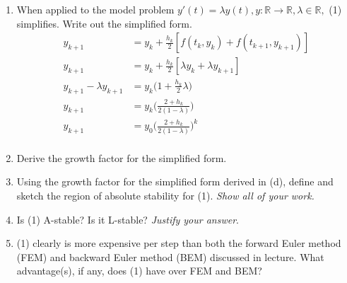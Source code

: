\documentclass{article}
\begin{document}
\begin{enumerate}
\begin{enumerate}
\begin{align*}
                    &\text{Using MVT to simplify} \\
                    y(t_{k+1}) - y_{k+1} &= 
                    y(t_k) - y_k + \frac{h}{2}
                    [f_y (t_k, \eta_k)(y(t_k) - y_k) 
                    + f_y (t_{k+1}, \eta_{k+1})(y(t_{k+1}) - y_{k+1})]
                    + \frac{h^3}{3!}y'''(\psi) \\
                    [I + f_y (t_{k+1}, \eta_{k+1})](y(t_{k+1}) - y_{k+1})] 
                    &= \frac{h}{2}
                    [I + f_y (t_k, \eta_k)](y(t_k) - y_k)
                    + \frac{h^3}{3!}y'''(\psi) \\
                \end{align*}
            \item When applied to the model problem $y'(t) = \lambda y(t),
                y: \mathbb{R} \rightarrow \mathbb{R}, \lambda \in 
                \mathbb{R},$ (1) simplifies. Write out the simplified form.
                \begin{align*}
                y_{k+1} &= y_k + \frac{h_k}{2}[f(t_k,y_k) 
                + f(t_{k+1}, y_{k+1})] \\
                y_{k+1} &= y_k + \frac{h_k}{2}[\lambda y_k
                + \lambda y_{k+1}] \\
                y_{k+1} - \lambda y_{k+1} &= 
                y_k \bigg( 1 +  \frac{h_k}{2}\lambda \bigg) \\
                y_{k+1} &= y_k \bigg( \frac{2 + h_k}{2(1-\lambda)}\bigg) \\
                y_{k+1} &= y_0 \bigg( \frac{2 + h_k}{2(1-\lambda)}
                \bigg)^k \\
                \end{align*}
            \item Derive the growth factor for the simplified form.
            \item Using the growth factor for the simplified form derived
                in (d), define and sketch the region of absolute stability
                for (1). \textit{Show all of your work.}
            \item Is (1) A-stable? Is it L-stable? \textit{Justify your 
                answer}.
            \item (1) clearly is more expensive per step than both the
                forward Euler method (FEM) and backward Euler method
                (BEM) discussed in lecture. What advantage(s), if any,
                does (1) have over FEM and BEM?
        \end{enumerate}
\end{enumerate}
\end{document}
